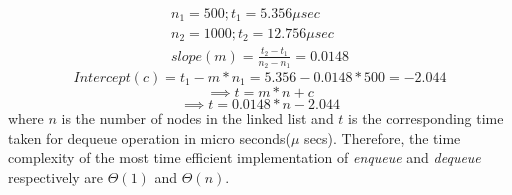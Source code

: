 \documentclass[journal,12pt,twocolumn]{IEEEtran}
\begin{document}
\begin{align}
    n_{1} = 500; t_{1} = 5.356 \mu sec  
\\
    n_{2} = 1000; t_{2} = 12.756 \mu sec
\\
    slope(m) = \frac{t_{2}-t_{1}}{n_{2}-n_{1}} = 0.0148
\end{align}
\begin{equation}
    Intercept(c) = t_{1} - m*n_{1} = 5.356 - 0.0148*500 = -2.044
\end{equation}
\begin{equation}
    \implies t = m*n + c
\end{equation}
\begin{equation}
    \implies t = 0.0148*n - 2.044
\end{equation}
where $n$ is the number of nodes in the linked list and $t$ is the corresponding time taken for dequeue operation in micro seconds($\mu$ secs).
\newline
Therefore, the time complexity of the most time efficient implementation of \emph{enqueue} and \emph{dequeue} respectively are $\Theta(1)$ and $\Theta(n)$.
\end{document}
